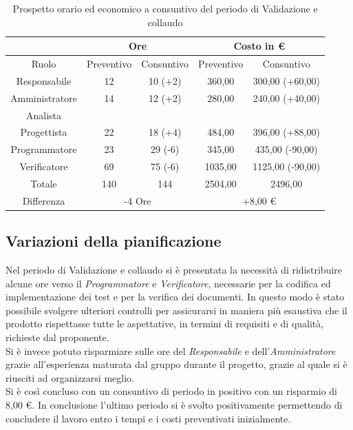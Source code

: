 \documentclass[./PianodiProgetto.tex]{subfiles}
\begin{document}
\begin{table}[H]
	\centering
	\begin{tabular}{|c|c|c|c|c|}
		\hline
		& \multicolumn{2}{c|}{Ore} & \multicolumn{2}{c|}{Costo in \euro{}}  \\ \hline
		Ruolo&Preventivo&Consuntivo&Preventivo&Consuntivo \\ \hline
		Responsabile&12&10 (+2)&360,00&300,00  (+60,00)  \\ \hline
		Amministratore&14&12 (+2)&280,00&240,00 (+40,00)  \\ \hline
		Analista& & & & \\ \hline
		Progettista&22&18 (+4)&484,00&396,00 (+88,00)  \\ \hline
		Programmatore&23&29 (-6)&345,00&435,00 (-90,00)  \\ \hline
		Verificatore&69&75 (-6)&1035,00&1125,00 (-90,00)  \\ \hline
		Totale&140&144&2504,00&2496,00 \\ \hline
		Differenza& \multicolumn{2}{c|}{-4 Ore} & \multicolumn{2}{c|}{+8,00 \euro{}} \\ \hline
	\end{tabular}
	\caption{Prospetto orario ed economico a consuntivo del periodo di Validazione e collaudo}
\end{table}

\subsection{Variazioni della pianificazione}
Nel periodo di Validazione e collaudo si è presentata la necessità di ridistribuire alcune ore verso il \textit{Programmatore} e \textit{Verificatore}, necessarie per la codifica ed implementazione dei test e per la verifica dei documenti. In questo modo è stato possibile svolgere ulteriori controlli per assicurarsi in maniera più esaustiva che il prodotto rispettasse tutte le aspettative, in termini
di requisiti e di qualità, richieste dal proponente.\\
Si è invece potuto risparmiare sulle ore del \textit{Responsabile} e dell'\textit{Amministratore} grazie all'esperienza maturata dal gruppo durante il progetto, grazie al quale si è riusciti ad organizzarsi meglio.\\
Si è così concluso con un consuntivo di periodo in positivo con un risparmio di 8,00 \euro{}. In conclusione l'ultimo periodo si è svolto positivamente permettendo di concludere il
lavoro entro i tempi e i costi preventivati inizialmente.
\end{document}
